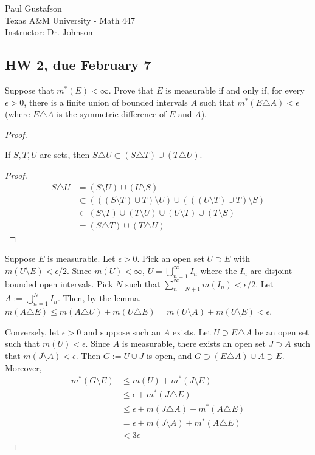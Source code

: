 \documentclass{article}
\begin{document}
\noindent Paul Gustafson\\
\noindent Texas A\&M University - Math 447\\ 
\noindent Instructor: Dr. Johnson

\subsection*{HW 2, due February 7}
 Suppose that $m^*(E) < \infty$. Prove that $E$ is measurable if and only if, for every $\epsilon > 0$, there is a finite union of bounded intervals $A$ such that $m^*(E\triangle A) < \epsilon$ (where $E\triangle A$ is the symmetric difference of $E$ and $A$).
\begin{proof}
\begin{lemma}\label{lem1}
If $S,T,U$ are sets, then $S\triangle U \subset (S\triangle T) \cup (T\triangle U)$.
\end{lemma}
\begin{proof}
\begin{align*} 
S \triangle U & = (S\setminus U) \cup (U \setminus S) \\
& \subset  (((S \setminus T) \cup T) \setminus U) \cup (((U \setminus T) \cup T) \setminus S) \\
&\subset  (S \setminus T) \cup (T \setminus U) \cup (U \setminus T) \cup (T \setminus S) \\
& =  (S\triangle T) \cup (T\triangle U)
\end{align*}
\end{proof}

Suppose $E$ is measurable. Let $\epsilon > 0$. Pick an open set $U \supset E$ with $m(U \setminus E) < \epsilon/2$. Since $m(U) < \infty$, $U = \bigcup_{n=1}^\infty I_n$ where the $I_n$ are disjoint bounded open intervals.  Pick $N$ such that $\sum_{n=N+1}^\infty m(I_n) < \epsilon/2$. Let $A := \bigcup_{n=1}^N I_n$. Then, by the lemma, $m(A \triangle E) \le m(A \triangle U) + m(U \triangle E)  = m(U \setminus A) + m(U\setminus E) < \epsilon$.

Conversely, let $\epsilon > 0$ and suppose such an $A$ exists. Let $U \supset E\triangle A$ be an open set such that $m(U) < \epsilon$. Since $A$ is measurable, there exists an open set $J\supset A$ such that $m(J\setminus A) < \epsilon$. Then $G := U \cup J$ is open, and $G \supset (E\triangle A) \cup A \supset E$. Moreover, 
\begin{align*}
m^*(G \setminus E) & \leq  m(U) + m^*(J \setminus E) 
\\ & \le \epsilon + m^*(J \triangle E)
\\ & \le \epsilon + m(J \triangle A) + m^*(A \triangle E)
\\ & = \epsilon + m(J \setminus A) + m^*(A \triangle E)
\\ & < 3\epsilon
\end{align*}
\end{proof}
\end{document}
